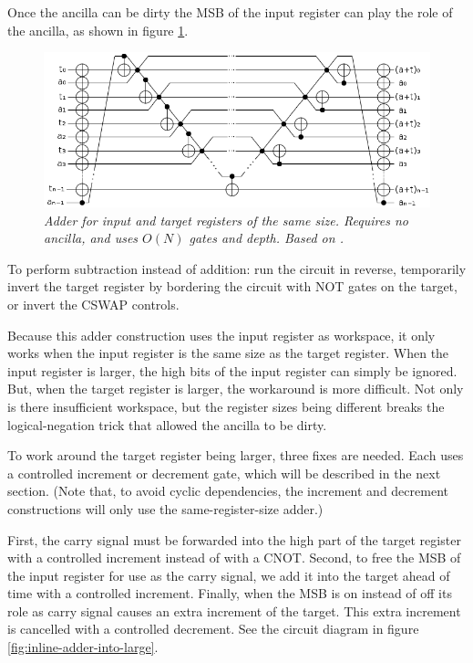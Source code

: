 \documentclass[twocolumn]{article}
\begin{document}
Once the ancilla can be dirty the MSB of the input register can play the role of the ancilla, as shown in figure \ref{fig:inlineadder}.

\begin{figure}
  \centering
  \includegraphics[width=\linewidth]{assets/inline-adder.png}
  \caption{\em Adder for input and target registers of the same size.
  Requires no ancilla, and uses $O(N)$ gates and depth.
  Based on \cite{van2004, takahashi2005}.}
  \label{fig:inlineadder}
\end{figure}

To perform subtraction instead of addition: run the circuit in reverse, temporarily invert the target register by bordering the circuit with NOT gates on the target, or invert the CSWAP controls.

Because this adder construction uses the input register as workspace, it only works when the input register is the same size as the target register.
When the input register is larger, the high bits of the input register can simply be ignored.
But, when the target register is larger, the workaround is more difficult.
Not only is there insufficient workspace, but the register sizes being different breaks the logical-negation trick that allowed the ancilla to be dirty.

To work around the target register being larger, three fixes are needed.
Each uses a controlled increment or decrement gate, which will be described in the next section.
(Note that, to avoid cyclic dependencies, the increment and decrement constructions will only use the same-register-size adder.)

First, the carry signal must be forwarded into the high part of the target register with a controlled increment instead of with a CNOT.
Second, to free the MSB of the input register for use as the carry signal, we add it into the target ahead of time with a controlled increment.
Finally, when the MSB is on instead of off its role as carry signal causes an extra increment of the target.
This extra increment is cancelled with a controlled decrement.
See the circuit diagram in figure \ref{fig:inline-adder-into-large}.
\end{document}
